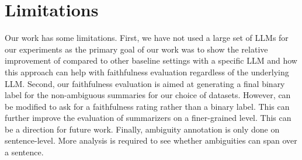 \section*{Limitations}
Our work has some limitations.
First, we have not used a large set of LLMs for our experiments as the primary goal of our work was to show the relative improvement of \method compared to other baseline settings with a specific LLM and how this approach can help with faithfulness evaluation regardless of the underlying LLM.
Second, our faithfulness evaluation is aimed at generating a final binary label for the non-ambiguous summaries for our choice of datasets. However, \method can be modified to ask for a faithfulness rating rather than a binary label. This can further improve the evaluation of summarizers on a finer-grained level. This can be a direction for future work.
Finally, ambiguity annotation is only done on sentence-level. More analysis is required to see whether ambiguities can span over a sentence.
